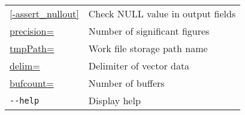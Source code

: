 \begin{table}[!htbp]
{\begin{center}
\begin{tabular}{l|l}
\hyperref[sect:option_assert_nullout]{[-assert\_nullout]}   & Check NULL value in output fields \\ %
\hyperref[sect:option_precision]{precision=}& Number of significant figures \\
\hyperref[sect:option_tmpPath]{tmpPath=}    & Work file storage path name \\
\hyperref[sect:option_delim]{delim=}        & Delimiter of vector data \\
\hyperref[sect:option_bufcount]{bufcount=}  & Number of buffers \\
                         \verb|--help|      & Display help \\
\hline
\end{tabular} 
\end{center}
}
\end{table} 




















%
